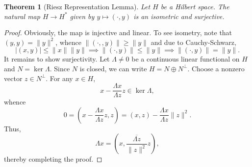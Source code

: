\documentclass[11pt]{article}
\theoremstyle{thmstyle}
\newtheorem{theorem}{Theorem}[section]
\theoremstyle{defstyle}
\renewcommand{\le}{\leqslant}
\renewcommand{\ge}{\geqslant}
\begin{document}
\begin{theorem}[Riesz Representation Lemma]
    Let $H$ be a Hilbert space. The natural map $H\to H^\ast$ given by $y\mapsto (\cdot, y)$ is an isometric and surjective.
\end{theorem}
\begin{proof}
    Obviously, the map is injective and linear. To see isometry, note that $(y, y) = \|y\|^2$, whence $\|(\cdot, ,y)\|\ge \|y\|$ and due to Cauchy-Schwarz, 
    \begin{equation*}
        |(x, y)|\le \|x\|\|y\|\implies \|(\cdot, y)\|\le \|y\|\implies\|(\cdot, y)\| = \|y\|.
    \end{equation*}
    It remains to show surjectivity. Let $\Lambda\ne 0$ be a continuous linear functional on $H$ and $N = \ker\Lambda$. Since $N$ is closed, we can write $H = N\oplus N^\perp$. Choose a nonzero vector $z\in N^\perp$. For any $x\in H$, 
    \begin{equation*}
        x - \frac{\Lambda x}{\Lambda z}z\in\ker\Lambda,
    \end{equation*}
    whence 
    \begin{equation*}
        0 = \left(x - \frac{\Lambda x}{\Lambda z}z, z\right) = (x, z) - \frac{\Lambda x}{\Lambda z}\|z\|^2.
    \end{equation*}
    Thus, 
    \begin{equation*}
        \Lambda x = \left(x, \frac{\overline{\Lambda z}}{\|z\|^2} z\right),
    \end{equation*}
    thereby completing the proof.
\end{proof}
\end{document}

